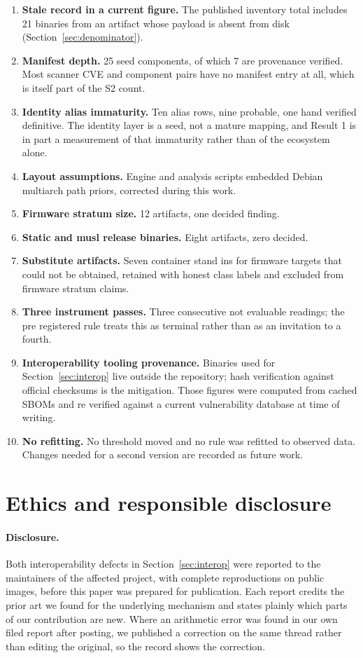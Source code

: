 \begin{enumerate}
findings from two directories that are not product artifacts
(Section~\ref{sec:denominator}).
\item \textbf{Stale record in a current figure.} The published inventory total
includes 21 binaries from an artifact whose payload is absent from disk
(Section~\ref{sec:denominator}).
\item \textbf{Manifest depth.} 25 seed components, of which 7 are provenance
verified. Most scanner CVE and component pairs have no manifest entry at all,
which is itself part of the S2 count.
\item \textbf{Identity alias immaturity.} Ten alias rows, nine probable, one hand
verified definitive. The identity layer is a seed, not a mature mapping, and
Result 1 is in part a measurement of that immaturity rather than of the ecosystem
alone.
\item \textbf{Layout assumptions.} Engine and analysis scripts embedded Debian
multiarch path priors, corrected during this work.
\item \textbf{Firmware stratum size.} 12 artifacts, one decided finding.
\item \textbf{Static and musl release binaries.} Eight artifacts, zero decided.
\item \textbf{Substitute artifacts.} Seven container stand ins for firmware
targets that could not be obtained, retained with honest class labels and
excluded from firmware stratum claims.
\item \textbf{Three instrument passes.} Three consecutive not evaluable readings;
the pre registered rule treats this as terminal rather than as an invitation to a
fourth.
\item \textbf{Interoperability tooling provenance.} Binaries used for
Section~\ref{sec:interop} live outside the repository; hash verification against
official checksums is the mitigation. Those figures were computed from cached
SBOMs and re verified against a current vulnerability database at time of
writing.
\item \textbf{No refitting.} No threshold moved and no rule was refitted to
observed data. Changes needed for a second version are recorded as future work.
\end{enumerate}

\section{Ethics and responsible disclosure}
\label{sec:ethics}

\paragraph{Disclosure.} Both interoperability defects in
Section~\ref{sec:interop} were reported to the maintainers of the affected
project, with complete reproductions on public images, before this paper was
prepared for publication. Each report credits the prior art we found for the
underlying mechanism and states plainly which parts of our contribution are new.
Where an arithmetic error was found in our own filed report after posting, we
published a correction on the same thread rather than editing the original, so
the record shows the correction.

